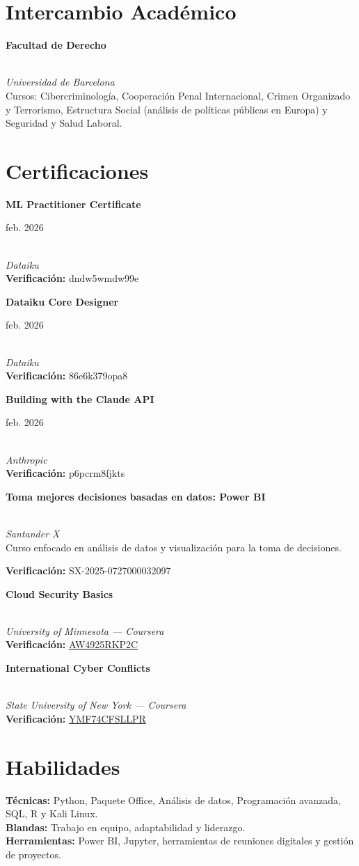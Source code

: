 \documentclass[letterpaper,10pt]{article}
\newcommand{\cventry}[4]{%
  \noindent\parbox[t]{0.74\textwidth}{\textbf{#1}}%
  \hfill
  \parbox[t]{0.24\textwidth}{\raggedleft #2}\\
  \textit{#3}\\
  #4\par\vspace{0.45em}
}
\newcommand{\certentry}[4]{%
  \noindent\parbox[t]{0.74\textwidth}{\textbf{#1}}%
  \hfill
  \parbox[t]{0.24\textwidth}{\raggedleft #2}\\
  \textit{#3}\\
  \textbf{Verificación:} #4\par\vspace{0.45em}
}
\newcommand{\certentrydesc}[5]{%
  \noindent\parbox[t]{0.74\textwidth}{\textbf{#1}}%
  \hfill
  \parbox[t]{0.24\textwidth}{\raggedleft #2}\\
  \textit{#3}\\
  #4\par
  \textbf{Verificación:} #5\par\vspace{0.45em}
}
\begin{document}
\section*{Intercambio Académico}
\cventry
  {Facultad de Derecho}
  {2024}
  {Universidad de Barcelona}
  {Cursos: Cibercriminología, Cooperación Penal Internacional, Crimen Organizado y Terrorismo, Estructura Social (análisis de políticas públicas en Europa) y Seguridad y Salud Laboral.}

\section*{Certificaciones}

\certentry
  {ML Practitioner Certificate}
  {feb. 2026}
  {Dataiku}
  {dndw5wmdw99e}

\certentry
  {Dataiku Core Designer}
  {feb. 2026}
  {Dataiku}
  {86e6k379opa8}

\certentry
  {Building with the Claude API}
  {feb. 2026}
  {Anthropic}
  {p6pcrm8fjkts}

\certentrydesc
  {Toma mejores decisiones basadas en datos: Power BI}
  {2025}
  {Santander X}
  {Curso enfocado en análisis de datos y visualización para la toma de decisiones.}
  {SX-2025-0727000032097}

\certentry
  {Cloud Security Basics}
  {2024}
  {University of Minnesota --- Coursera}
  {\href{https://coursera.org/verify/AW4925RKP2C}{AW4925RKP2C}}

\certentry
  {International Cyber Conflicts}
  {2024}
  {State University of New York --- Coursera}
  {\href{https://coursera.org/verify/YMF74CFSLLPR}{YMF74CFSLLPR}}

\section*{Habilidades}
\textbf{Técnicas:} Python, Paquete Office, Análisis de datos, Programación avanzada, SQL, R y Kali Linux.\\
\textbf{Blandas:} Trabajo en equipo, adaptabilidad y liderazgo.\\
\textbf{Herramientas:} Power BI, Jupyter, herramientas de reuniones digitales y gestión de proyectos.
\end{document}
